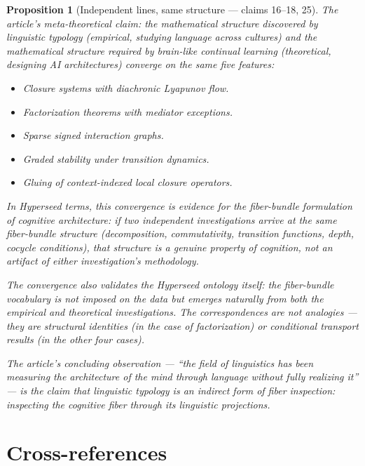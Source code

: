 \documentclass[11pt,a4paper]{article}
\newtheorem{proposition}[definition]{Proposition}
\begin{document}
\begin{proposition}[Independent lines, same structure --- claims 16--18, 25]
\label{prop:convergence}
The article's meta-theoretical claim: the mathematical structure
discovered by linguistic typology (empirical, studying language
across cultures) and the mathematical structure required by
brain-like continual learning (theoretical, designing AI
architectures) converge on the same five features:

\begin{itemize}
\item Closure systems with diachronic Lyapunov flow.
\item Factorization theorems with mediator exceptions.
\item Sparse signed interaction graphs.
\item Graded stability under transition dynamics.
\item Gluing of context-indexed local closure operators.
\end{itemize}

In Hyperseed terms, this convergence is evidence for the
fiber-bundle formulation of cognitive architecture: if two
independent investigations arrive at the same fiber-bundle
structure (decomposition, commutativity, transition functions,
depth, cocycle conditions), that structure is a genuine property
of cognition, not an artifact of either investigation's methodology.

The convergence also validates the Hyperseed ontology itself:
the fiber-bundle vocabulary is not imposed on the data but
emerges naturally from both the empirical and theoretical
investigations. The correspondences are not analogies --- they
are structural identities (in the case of factorization) or
conditional transport results (in the other four cases).

The article's concluding observation --- ``the field of linguistics
has been measuring the architecture of the mind through language
without fully realizing it'' --- is the claim that linguistic
typology is an indirect form of fiber inspection: inspecting the
cognitive fiber through its linguistic projections.
\end{proposition}


\section{Cross-references}
\end{document}
